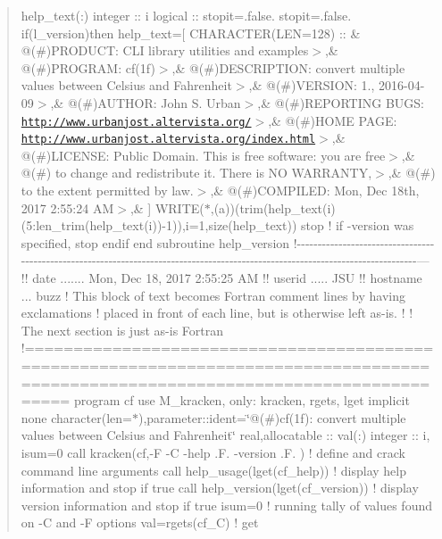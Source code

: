 \begin{quote}
help\+\_\+text(\+:) integer \+:\+: i logical \+:\+: stopit=.false. stopit=.false. if(l\+\_\+version)then help\+\_\+text=\mbox{[} C\+H\+A\+R\+A\+C\+T\+ER(L\+EN=128) \+:\+: \& \textquotesingle{}@(\#)P\+R\+O\+D\+U\+CT\+: C\+LI library utilities and examples$>$\textquotesingle{},\& \textquotesingle{}@(\#)P\+R\+O\+G\+R\+AM\+: cf(1f)$>$\textquotesingle{},\& \textquotesingle{}@(\#)D\+E\+S\+C\+R\+I\+P\+T\+I\+ON\+: convert multiple values between Celsius and Fahrenheit$>$\textquotesingle{},\& \textquotesingle{}@(\#)V\+E\+R\+S\+I\+ON\+: 1., 2016-\/04-\/09$>$\textquotesingle{},\& \textquotesingle{}@(\#)A\+U\+T\+H\+OR\+: John S. Urban$>$\textquotesingle{},\& \textquotesingle{}@(\#)R\+E\+P\+O\+R\+T\+I\+NG B\+U\+GS\+: \href{http://www.urbanjost.altervista.org/}{\tt http\+://www.\+urbanjost.\+altervista.\+org/}$>$\textquotesingle{},\& \textquotesingle{}@(\#)H\+O\+ME P\+A\+GE\+: \href{http://www.urbanjost.altervista.org/index.html}{\tt http\+://www.\+urbanjost.\+altervista.\+org/index.\+html}$>$\textquotesingle{},\& \textquotesingle{}@(\#)L\+I\+C\+E\+N\+SE\+: Public Domain. This is free software\+: you are free$>$\textquotesingle{},\& \textquotesingle{}@(\#) to change and redistribute it. There is NO W\+A\+R\+R\+A\+N\+TY,$>$\textquotesingle{},\& \textquotesingle{}@(\#) to the extent permitted by law.$>$\textquotesingle{},\& \textquotesingle{}@(\#)C\+O\+M\+P\+I\+L\+ED\+: Mon, Dec 18th, 2017 2\+:55\+:24 AM$>$\textquotesingle{},\& \textquotesingle{}\textquotesingle{}\mbox{]} W\+R\+I\+TE($\ast$,\textquotesingle{}(a)\textquotesingle{})(trim(help\+\_\+text(i)(5\+:len\+\_\+trim(help\+\_\+text(i))-\/1)),i=1,size(help\+\_\+text)) stop ! if -\/version was specified, stop endif end subroutine help\+\_\+version !-\/-\/-\/-\/-\/-\/-\/-\/-\/-\/-\/-\/-\/-\/-\/-\/-\/-\/-\/-\/-\/-\/-\/-\/-\/-\/-\/-\/-\/-\/-\/-\/-\/-\/-\/-\/-\/-\/-\/-\/-\/-\/-\/-\/-\/-\/-\/-\/-\/-\/-\/-\/-\/-\/-\/-\/-\/-\/-\/-\/-\/-\/-\/-\/-\/-\/-\/-\/-\/-\/-\/-\/-\/-\/-\/-\/-\/-\/-\/-\/-\/-\/-\/-\/-\/-\/-\/-\/-\/-\/-\/-\/-\/-\/-\/-\/-\/-\/-\/-\/-\/-\/-\/-\/-\/-\/-\/-\/-\/-\/-\/-\/-\/-\/-\/-\/-\/-\/-\/-\/-\/-\/-\/-\/-\/-\/-\/-\/--- !! date ....... Mon, Dec 18, 2017 2\+:55\+:25 AM !! userid ..... J\+SU !! hostname ... buzz ! This block of text becomes Fortran comment lines by having exclamations ! placed in front of each line, but is otherwise left as-\/is. ! ! The next section is just as-\/is Fortran !=================================================================================================================================== program cf use M\+\_\+kracken, only\+: kracken, rgets, lget implicit none character(len=$\ast$),parameter\+::ident=\char`\"{}@(\#)cf(1f)\+: convert multiple values between Celsius and Fahrenheit\char`\"{} real,allocatable \+:\+: val(\+:) integer \+:\+: i, isum=0 call kracken(\textquotesingle{}cf\textquotesingle{},\textquotesingle{}-\/F -\/C -\/help .F. -\/version .F.\textquotesingle{} ) ! define and crack command line arguments call help\+\_\+usage(lget(\textquotesingle{}cf\+\_\+help\textquotesingle{})) ! display help information and stop if true call help\+\_\+version(lget(\textquotesingle{}cf\+\_\+version\textquotesingle{})) ! display version information and stop if true isum=0 ! running tally of values found on -\/C and -\/F options val=rgets(\textquotesingle{}cf\+\_\+C\textquotesingle{}) ! get 
\end{quote}
